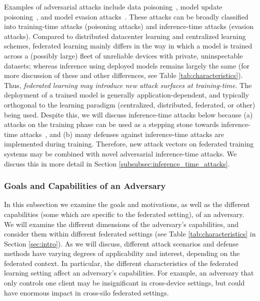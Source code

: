 \documentclass[11pt]{article}
\begin{document}
Examples of adversarial attacks include data poisoning~\citep{Biggio:2012:PAA:3042573.3042761, DBLP:conf/ndss/LiuMALZW018}, model update poisoning~\citep{bagdasaryan18backdoor, pmlr-v97-bhagoji19a}, and model evasion attacks~\citep{szegedy2013intriguing, Biggio:2012:PAA:3042573.3042761, DBLP:journals/corr/GoodfellowSS14}. These attacks can be broadly classified into training-time attacks (poisoning attacks) and inference-time attacks (evasion attacks). Compared to distributed datacenter learning and centralized learning schemes, federated learning mainly differs in the way in which a model is trained across a (possibly large) fleet of unreliable devices with private, uninspectable datasets; whereas inference using deployed models remains largely the same (for more discussion of these and other differences, see Table \ref{tab:characteristics}). Thus, \emph{federated learning may introduce new attack surfaces at training-time}. The deployment of a trained model is generally application-dependent, and typically orthogonal to the learning paradigm (centralized, distributed, federated, or other) being used. Despite this, we will discuss inference-time attacks below because (a) attacks on the training phase can be used as a stepping stone towards inference-time attacks~\citep{DBLP:conf/ndss/LiuMALZW018,pmlr-v97-bhagoji19a}, and (b) many defenses against inference-time attacks are implemented during training. Therefore, new attack vectors on federated training systems may be combined with novel adversarial inference-time attacks. We discuss this in more detail in Section \ref{subsubsec:inference_time_attacks}.

\subsubsection{Goals and Capabilities of an Adversary}
\label{subsubsec:attack_goals_capabilities}
In this subsection we examine the goals and motivations, as well as the different capabilities (some which are specific to the federated setting), of an adversary. We will examine the different dimensions of the adversary's capabilities, and consider them within different federated settings (see Table \ref{tab:characteristics} in Section \ref{sec:intro}). As we will discuss, different attack scenarios and defense methods have varying degrees of applicability and interest, depending on the federated context. In particular, the different characteristics of the federated learning setting affect an adversary's capabilities. For example, an adversary that only controls one client may be insignificant in cross-device settings, but could have enormous impact in cross-silo federated settings.
\end{document}
